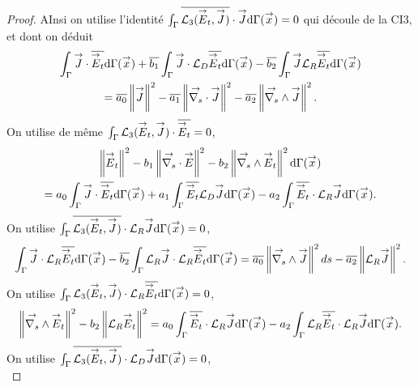 \begin{proof}
    AInsi on utilise l'identité \(\int_\Gamma {\overline{\mathcal{L}_3({\overset{\rightarrow}{E}}_t,{\overset{\rightarrow}{J}})}}\cdot {\overset{\rightarrow}{J}} \mathrm{d}{\Gamma}({\overset{\rightarrow}{x}}) = 0\) qui découle de la CI3, et dont on déduit
    \begin{multline}
      \label{eq:unicite:ci3:csu3-1}
      \int_\Gamma \vJ \cdot \conj{\vE_t}\dd{\Gamma}(\vx)   + \conj{b_1} \int_\Gamma \vJ\cdot \LD\conj{\vE_t}\dd{\Gamma}(\vx)  - \conj{b_2} \int_\Gamma \vJ \LR\conj{\vE_t}\dd{\Gamma}(\vx)  \\
      = \conj{a_0} \norm{\vJ}^2 - \conj{a_1} \norm{\vdivs \vJ}^2  - \conj{a_2} \norm{\vrots \vJ}^2. 
    \end{multline}
    On utilise de même \(\int_\Gamma {\mathcal{L}_3({\overset{\rightarrow}{E}}_t,{\overset{\rightarrow}{J}})}\cdot {\overline{{\overset{\rightarrow}{E}}_t}} = 0\),
    \begin{multline}
      \label{eq:unicite:ci3:csu3-2}
      \norm{\vE_t}^2   - b_1 \norm{ \vdivs \vE }^2  - b_2 \norm{\vrots \vE_t}^2\dd{\Gamma}(\vx)  \\
      = a_0 \int_\Gamma \vJ\cdot \conj{\vE_t}\dd{\Gamma}(\vx) + a_1 \int_\Gamma \conj{\vE_t} \LD \vJ\dd{\Gamma}(\vx)  - a_2 \int_\Gamma \conj{\vE_t} \cdot \LR \vJ \dd{\Gamma}(\vx).
    \end{multline}
    On utilise \(\int_\Gamma {\overline{\mathcal{L}_3({\overset{\rightarrow}{E}}_t,{\overset{\rightarrow}{J}})}}\cdot{\mathcal{L}_R}{\overset{\rightarrow}{J}}\mathrm{d}{\Gamma}({\overset{\rightarrow}{x}}) = 0\),
    \begin{equation}
      \label{eq:unicite:ci3:csu3-3}
      \int_\Gamma \vJ \cdot \LR \conj{\vE_t}\dd{\Gamma}(\vx)   - \conj{b_2} \int_\Gamma \LR \vJ \cdot \LR \conj{\vE_t}\dd{\Gamma}(\vx)
      =  \conj{a_0} \norm{ \vrots \vJ}^2ds - \conj{a_2} \norm{ \LR \vJ}^2. 
    \end{equation}
    On utilise \(\int_\Gamma {\mathcal{L}_3({\overset{\rightarrow}{E}}_t,{\overset{\rightarrow}{J}})}\cdot{\mathcal{L}_R}{\overline{{\overset{\rightarrow}{E}}_t}}\mathrm{d}{\Gamma}({\overset{\rightarrow}{x}})=0\),
    \begin{equation}
      \label{eq:unicite:ci3:csu3-4}
      \norm{ \vrots \vE_t }^2   - {b_2} \norm{ \LR \vE_t}^2 
      = a_0 \int_\Gamma \conj{\vE_t} \cdot \LR \vJ \dd{\Gamma}(\vx) - a_2 \int_\Gamma \LR \conj{\vE_t} \cdot \LR \vJ \dd{\Gamma}(\vx).
    \end{equation}
    On utilise \(\int_\Gamma {\overline{\mathcal{L}_3({\overset{\rightarrow}{E}}_t,{\overset{\rightarrow}{J}})}}\cdot{\mathcal{L}_D}{\overset{\rightarrow}{J}}\mathrm{d}{\Gamma}({\overset{\rightarrow}{x}})=0\),
    \begin{equation}

\end{equation}
\end{proof}
